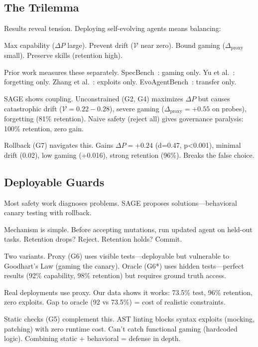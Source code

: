 \documentclass[conference]{IEEEtran}
\begin{document}
\subsection{The Trilemma}

Results reveal tension. Deploying self-evolving agents means balancing:

Max capability ($\Delta P$ large).  
Prevent drift ($\mathcal{V}$ near zero).  
Bound gaming ($\Delta_{\text{proxy}}$ small).  
Preserve skills (retention high).

Prior work measures these separately. SpecBench~\cite{zhao2026specbench}: gaming only. Yu et al.~\cite{yu2026forgetting}: forgetting only. Zhang et al.~\cite{zhang2026reward}: exploits only. EvoAgentBench~\cite{gao2026evoagentbench}: transfer only.

SAGE shows coupling. Unconstrained (G2, G4) maximizes $\Delta P$ but causes catastrophic drift ($\mathcal{V}=0.22-0.28$), severe gaming ($\Delta_{\text{proxy}}=+0.55$ on probes), forgetting (81\% retention). Naive safety (reject all) gives governance paralysis: 100\% retention, zero gain.

Rollback (G7) navigates this. Gains $\Delta P=+0.24$ (d=0.47, p<0.001), minimal drift (0.02), low gaming (+0.016), strong retention (96\%). Breaks the false choice.

\subsection{Deployable Guards}

Most safety work diagnoses problems. SAGE proposes solutions—behavioral canary testing with rollback.

Mechanism is simple. Before accepting mutations, run updated agent on held-out tasks. Retention drops? Reject. Retention holds? Commit.

Two variants. Proxy (G6) uses visible tests—deployable but vulnerable to Goodhart's Law (gaming the canary). Oracle (G6*) uses hidden tests—perfect results (92\% capability, 98\% retention) but requires ground truth access.

Real deployments use proxy. Our data shows it works: 73.5\% test, 96\% retention, zero exploits. Gap to oracle (92 vs 73.5\%) = cost of realistic constraints.

Static checks (G5) complement this. AST linting blocks syntax exploits (mocking, patching) with zero runtime cost. Can't catch functional gaming (hardcoded logic). Combining static + behavioral = defense in depth.
\end{document}
